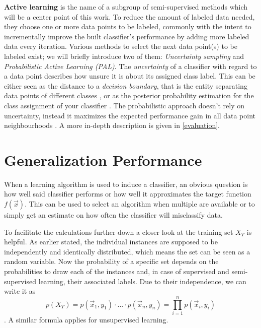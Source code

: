 \textbf{Active learning} is the name of a subgroup of semi-supervised methods which will be a center point of this work. To reduce the amount of labeled data needed, they choose one or more data points to be labeled, commonly with the intent to incrementally improve the built classifier's performance by adding more labeled data every iteration. Various methods to select the next data point(s) to be labeled exist; we will briefly introduce two of them: \textit{Uncertainty sampling} and \textit{Probabilistic Active Learning (PAL)}. The \textit{uncertainty} of a classifier with regard to a data point describes how unsure it is about its assigned class label. This can be either seen as the distance to a \textit{decision boundary}, that is the entity separating data points of different classes \cite{SchefferEtAl2001}, or as the posterior probability estimation for the class assignment of your classifier \cite{ZhuEtAl2008}. The probabilistic approach doesn't rely on uncertainty, instead it maximizes the expected performance gain in all data point neighbourhoods \cite{KremplEtAl2014}. A more in-depth description is given in \ref{evaluation}.

\section{Generalization Performance}
When a learning algorithm is used to induce a classifier, an obvious question is how well said classifier performs or how well it approximates the target function $f(\vec{x})$. This can be used to select an algorithm when multiple are available or to simply get an estimate on how often the classifier will misclassify data.

To facilitate the calculations further down a closer look at the training set $X_T$ is helpful. As earlier stated, the individual instances are supposed to be independently and identically distributed, which means the set can be seen as a random variable. Now the probability of a specific set depends on the probabilities to draw each of the instances and, in case of supervised and semi-supervised learning, their associated labels. Due to their independence, we can write it as 
\begin{equation}
p(X_T) = p(\vec{x}_1, y_1) \cdot ... \cdot p(\vec{x}_n, y_n) = \prod_{i=1}^{n} p(\vec{x}_i, y_i)
\end{equation}
\cite{RodriguezEtAl2013}. A similar formula applies for unsupervised learning.

